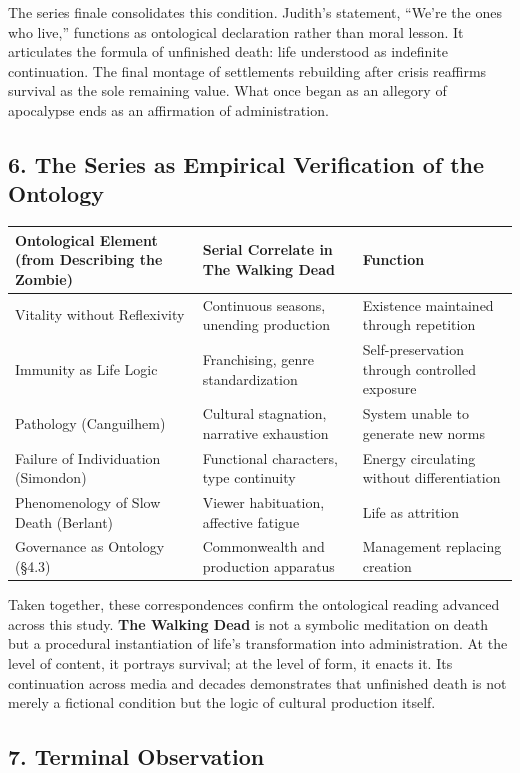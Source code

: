 \documentclass[11pt]{article}
\begin{document}
The series finale consolidates this condition.  Judith’s statement, “We’re the ones who live,” functions as ontological declaration rather than moral lesson.  It articulates the formula of unfinished death: life understood as indefinite continuation.  The final montage of settlements rebuilding after crisis reaffirms survival as the sole remaining value.  What once began as an allegory of apocalypse ends as an affirmation of administration.  
\subsection*{6. The Series as Empirical Verification of the Ontology}
\label{sec:orga58bd58}

\begin{center}
\begin{tabular}{lll}
Ontological Element (from \textbf{Describing the Zombie}) & Serial Correlate in \textbf{The Walking Dead} & Function\\
\hline
Vitality without Reflexivity & Continuous seasons, unending production & Existence maintained through repetition\\
Immunity as Life Logic & Franchising, genre standardization & Self-preservation through controlled exposure\\
Pathology (Canguilhem) & Cultural stagnation, narrative exhaustion & System unable to generate new norms\\
Failure of Individuation (Simondon) & Functional characters, type continuity & Energy circulating without differentiation\\
Phenomenology of Slow Death (Berlant) & Viewer habituation, affective fatigue & Life as attrition\\
Governance as Ontology (§4.3) & Commonwealth and production apparatus & Management replacing creation\\
\end{tabular}
\end{center}

Taken together, these correspondences confirm the ontological reading advanced across this study.  \textbf{The Walking Dead} is not a symbolic meditation on death but a procedural instantiation of life’s transformation into administration.  At the level of content, it portrays survival; at the level of form, it enacts it.  Its continuation across media and decades demonstrates that unfinished death is not merely a fictional condition but the logic of cultural production itself.  
\subsection*{7. Terminal Observation}
\label{sec:org6f9b8ef}
\end{document}
